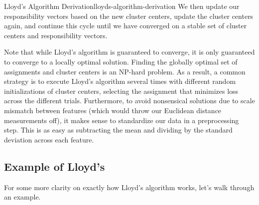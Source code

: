 \begin{derivation}{Lloyd's Algorithm Derivation}{lloyds-algorithm-derivation}
	We then update our responsibility vectors based on the new cluster centers, update the cluster centers again, and continue this cycle until we have converged on a stable set of cluster centers and responsibility vectors.
\end{derivation}

Note that while Lloyd's algorithm is guaranteed to converge, it is only guaranteed to converge to a locally optimal solution. Finding the globally optimal set of assignments and cluster centers is an NP-hard problem. As a result, a common strategy is to execute Lloyd's algorithm several times with different random initializations of cluster centers, selecting the assignment that minimizes loss across the different trials. Furthermore, to avoid nonsensical solutions due to scale mismatch between features (which would throw our Euclidean distance measurements off), it makes sense to standardize our data in a preprocessing step. This is as easy as subtracting the mean and dividing by the standard deviation across each feature.

\subsection{Example of Lloyd's}
For some more clarity on exactly how Lloyd's algorithm works, let's walk through an example.

